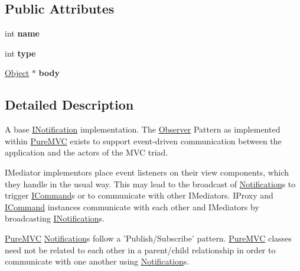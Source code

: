 \subsection*{Public Attributes}
\begin{DoxyCompactItemize}
\item 
\hypertarget{class_pure_m_v_c_1_1_notification_a00855f657d6a6e3eaf836911f79e9a94}{
int {\bfseries name}}
\label{class_pure_m_v_c_1_1_notification_a00855f657d6a6e3eaf836911f79e9a94}

\item 
\hypertarget{class_pure_m_v_c_1_1_notification_a6086796e14cd9930f56c381ab5cbfcd7}{
int {\bfseries type}}
\label{class_pure_m_v_c_1_1_notification_a6086796e14cd9930f56c381ab5cbfcd7}

\item 
\hypertarget{class_pure_m_v_c_1_1_notification_ad4860d7b0819f8161c67517277772229}{
\hyperlink{class_pure_m_v_c_1_1_object}{Object} $\ast$ {\bfseries body}}
\label{class_pure_m_v_c_1_1_notification_ad4860d7b0819f8161c67517277772229}

\end{DoxyCompactItemize}


\subsection{Detailed Description}
A base {\ttfamily \hyperlink{class_pure_m_v_c_1_1_i_notification}{INotification}} implementation. The \hyperlink{class_pure_m_v_c_1_1_observer}{Observer} Pattern as implemented within \hyperlink{namespace_pure_m_v_c}{PureMVC} exists to support event-\/driven communication between the application and the actors of the MVC triad.

{\ttfamily IMediator} implementors place event listeners on their view components, which they handle in the usual way. This may lead to the broadcast of {\ttfamily \hyperlink{class_pure_m_v_c_1_1_notification}{Notification}}s to trigger {\ttfamily \hyperlink{class_pure_m_v_c_1_1_i_command}{ICommand}}s or to communicate with other {\ttfamily IMediators}. {\ttfamily IProxy} and {\ttfamily \hyperlink{class_pure_m_v_c_1_1_i_command}{ICommand}} instances communicate with each other and {\ttfamily IMediator}s by broadcasting {\ttfamily \hyperlink{class_pure_m_v_c_1_1_i_notification}{INotification}}s.

\hyperlink{namespace_pure_m_v_c}{PureMVC} {\ttfamily \hyperlink{class_pure_m_v_c_1_1_notification}{Notification}}s follow a 'Publish/Subscribe' pattern. \hyperlink{namespace_pure_m_v_c}{PureMVC} classes need not be related to each other in a parent/child relationship in order to communicate with one another using {\ttfamily \hyperlink{class_pure_m_v_c_1_1_notification}{Notification}}s.

